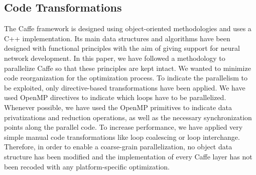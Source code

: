 \subsection{Code Transformations}
The Caffe framework is designed using object-oriented methodologies and uses a C++ implementation. 
Its main data structures and algorithms have been designed with 
functional principles with the aim of giving support for neural network 
development. In this paper, we have followed a methodology to 
parallelize Caffe so that these principles are kept intact. We wanted to minimize 
code reorganization for the optimization process.
To indicate the parallelism to be exploited, only directive-based 
transformations have been applied. We have used OpenMP \cite{basumallik2007programming} directives 
to indicate which loops have to be parallelized. Whenever possible, 
we have used the OpenMP primitives to indicate data privatizations 
and reduction operations, as well as the necessary synchronization 
points along the parallel code. To increase performance, we have 
applied very simple manual code transformations like loop coalescing or 
loop interchange. Therefore, in order to enable a coarse-grain 
parallelization, no object data structure has been modified and 
the implementation of every Caffe layer has not been recoded with 
any platform-specific optimization.

